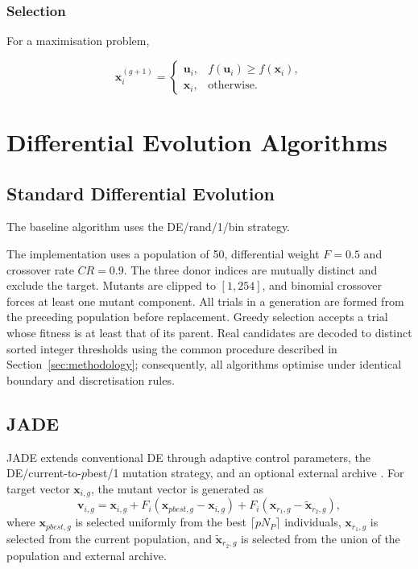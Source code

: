 \documentclass[review,authoryear]{elsarticle}
\begin{document}
\subsubsection{Selection}

For a maximisation problem,

\begin{equation}
\mathbf{x}_{i}^{(g+1)}
=
\begin{cases}
\mathbf{u}_{i},
& f(\mathbf{u}_{i}) \geq f(\mathbf{x}_{i}),\\

\mathbf{x}_{i},
& \text{otherwise}.
\end{cases}
\end{equation}





\section{Differential Evolution Algorithms}
\label{sec:algorithms}


\subsection{Standard Differential Evolution}

The baseline algorithm uses the DE/rand/1/bin strategy.

The implementation uses a population of 50, differential weight $F=0.5$
and crossover rate $CR=0.9$. The three donor indices are mutually distinct
and exclude the target. Mutants are clipped to $[1,254]$, and binomial
crossover forces at least one mutant component. All trials in a generation
are formed from the preceding population before replacement. Greedy
selection accepts a trial whose fitness is at least that of its parent.
Real candidates are decoded to distinct sorted integer thresholds using the
common procedure described in Section~\ref{sec:methodology}; consequently,
all algorithms optimise under identical boundary and discretisation rules.


\subsection{JADE} 
\label{sec:jade} 
JADE extends conventional DE through adaptive control parameters, the DE/current-to-$p$best/1 mutation strategy, and an optional external archive \citep{zhang2009jade}. For target vector $\mathbf{x}_{i,g}$, the mutant vector is generated as \begin{equation} 
\mathbf{v}_{i,g} = 
\mathbf{x}_{i,g} 
+ F_i\left(\mathbf{x}_{pbest,g}-\mathbf{x}_{i,g}\right) 
+ F_i\left(\mathbf{x}_{r_1,g}-\widetilde{\mathbf{x}}_{r_2,g}\right), 
\end{equation}where $\mathbf{x}_{pbest,g}$ is selected uniformly from the best $\lceil pN_P\rceil$ individuals, $\mathbf{x}_{r_1,g}$ is selected from the current population, and $\widetilde{\mathbf{x}}_{r_2,g}$ is selected from the union of the population and external archive. 
\end{document}

